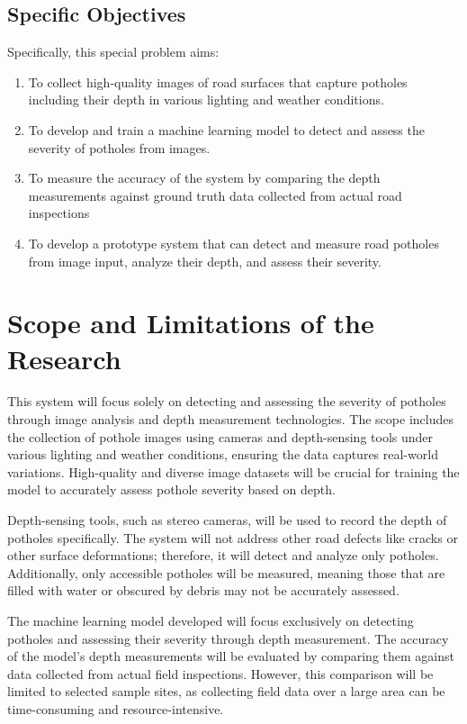 \subsection{Specific Objectives}
\label{sec:specificobjectives}

Specifically, this special problem aims:
\begin{enumerate}
	\item To collect high-quality images of road surfaces that capture potholes including their depth in various lighting and weather conditions.
	\item To develop and train a machine learning model to detect and assess the severity of potholes from images. 
	\item To measure the accuracy of the system by comparing the depth measurements against ground truth data collected from actual road inspections
	\item To develop a prototype system that can detect and measure road potholes from image input, analyze their depth, and assess their severity.
\end{enumerate}

\section{Scope and Limitations of the Research}
\label{sec:scopelimitations}



This system will focus solely on detecting and assessing the severity of potholes through image analysis and depth measurement technologies. The scope includes the collection of pothole images using cameras and depth-sensing tools under various lighting and weather conditions, ensuring the data captures real-world variations. High-quality and diverse image datasets will be crucial for training the model to accurately assess pothole severity based on depth.

Depth-sensing tools, such as stereo cameras, will be used to record the depth of potholes specifically. The system will not address other road defects like cracks or other surface deformations; therefore, it will detect and analyze only potholes. Additionally, only accessible potholes will be measured, meaning those that are filled with water or obscured by debris may not be accurately assessed.

The machine learning model developed will focus exclusively on detecting potholes and assessing their severity through depth measurement. The accuracy of the model’s depth measurements will be evaluated by comparing them against data collected from actual field inspections. However, this comparison will be limited to selected sample sites, as collecting field data over a large area can be time-consuming and resource-intensive.

